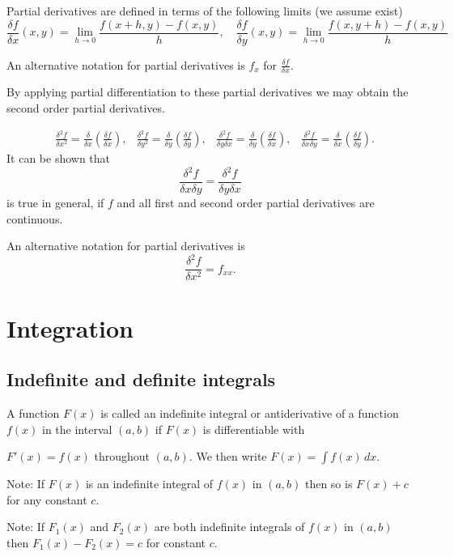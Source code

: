 \documentclass[10pt, a4paper]{article}
\begin{document}
Partial derivatives are defined in terms of the following limits (we assume exist)
\[
\frac{\delta f}{\delta x}(x, y) = \lim_{h \rightarrow 0}\frac{f(x + h, y) -f(x, y)}{h},
\quad
\frac{\delta f}{\delta y}(x, y) = \lim_{h \rightarrow 0}\frac{f(x, y + h) -f(x, y)}{h}
\]

An alternative notation for partial derivatives is $f_x$ for $\frac{\delta f}{\delta x}$.

By applying partial differentiation to these partial derivatives we may obtain the second order partial derivatives.

\begin{align*}
    &\frac{\delta ^ 2 f}{\delta x ^ 2} = \frac{\delta}{\delta x}\left(\frac{\delta f}{\delta x}\right),
    &\frac{\delta ^ 2 f}{\delta y ^ 2} = \frac{\delta}{\delta y}\left(\frac{\delta f}{\delta y}\right),
    &\frac{\delta ^ 2 f}{\delta y \delta x} = \frac{\delta}{\delta y}\left(\frac{\delta f}{\delta x}\right),
    &\frac{\delta ^ 2 f}{\delta x \delta y} = \frac{\delta}{\delta x}\left(\frac{\delta f}{\delta y}\right).
\end{align*}
It can be shown that
\[
\frac{\delta ^ 2 f}{\delta x \delta y} = \frac{\delta ^ 2 f}{\delta y \delta x}
\]
is true in general, if $f$ and all first and second order partial derivatives are continuous.

An alternative notation for partial derivatives is
\[
\frac{\delta ^ 2 f}{\delta x ^ 2} = f_{xx}.
\]

\newpage

\section{Integration}

\subsection{Indefinite and definite integrals}
\begin{definition}
    A function $F(x)$ is called an indefinite integral or antiderivative of a function $f(x)$ in the interval $(a, b)$ if $F(x)$ is differentiable with

    $F'(x) = f(x)$ throughout $(a, b)$. We then write $F(x) = \int f(x)\,dx$.
\end{definition}

Note: If $F(x)$ is an indefinite integral of $f(x)$ in $(a, b)$ then so is $F(x) + c$ for any constant $c$.

Note: If $F_1(x)$ and $F_2(x)$ are both indefinite integrals of $f(x)$ in $(a, b)$ then $F_1(x) - F_2(x) = c$ for constant $c$.
\end{document}
